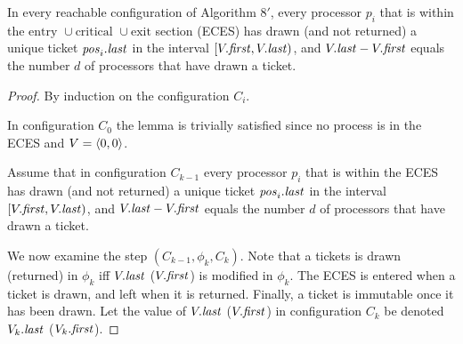 \begin{lemma} \label{lemma:3.0bounded}
In every reachable configuration of Algorithm $8'$, every processor $p_i$
that is within the $\text{entry } \cup \text{critical } \cup \text{exit}$
section (ECES) has drawn (and not returned) a unique ticket $\mathit{pos}_i.\mathit{last}$ in the
interval $[V.\mathit{first}, V.\mathit{last})$, and $V.\mathit{last} - V.\mathit{first}$ equals the number
$d$ of processors that have drawn a ticket.
\end{lemma}

\begin{proof}
By induction on the configuration $C_i$.

In configuration $C_0$ the lemma is trivially satisfied since no process is in
the ECES and $V = \langle 0, 0 \rangle$.

Assume that in configuration $C_{k-1}$ every processor $p_i$
that is within the ECES has drawn (and not returned) a unique ticket $\mathit{pos}_i.\mathit{last}$ in the
interval $[V.\mathit{first}, V.\mathit{last})$, and $V.\mathit{last} - V.\mathit{first}$ equals the number
$d$ of processors that have drawn a ticket.

We now examine the step $(C_{k-1}, \phi_k, C_k)$. Note that a tickets is
drawn (returned) in $\phi_k$ iff $V.\mathit{last}$ ($V.\mathit{first}$) is modified in $\phi_k$.
The ECES is entered when a ticket is drawn, and left when it is returned.
Finally, a ticket is immutable once it has been drawn.
Let the value of $V.\mathit{last}$ ($V.\mathit{first}$) in configuration $C_k$ be denoted
$V_k.\mathit{last}$ ($V_k.\mathit{first}$).


\end{proof}
